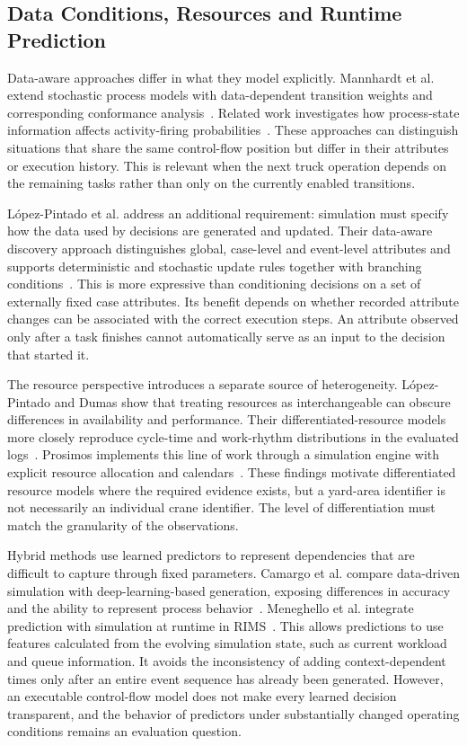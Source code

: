 \subsection{Data Conditions, Resources and Runtime Prediction}

Data-aware approaches differ in what they model explicitly. Mannhardt et al. extend stochastic process models with data-dependent transition weights and corresponding conformance analysis~\cite{mannhardt2023stochasticProcessesModelling}. Related work investigates how process-state information affects activity-firing probabilities~\cite{Vinci2023Inf.Activ.Prob}. These approaches can distinguish situations that share the same control-flow position but differ in their attributes or execution history. This is relevant when the next truck operation depends on the remaining tasks rather than only on the currently enabled transitions.

L\'opez-Pintado et al. address an additional requirement: simulation must specify how the data used by decisions are generated and updated. Their data-aware discovery approach distinguishes global, case-level and event-level attributes and supports deterministic and stochastic update rules together with branching conditions~\cite{lopez2024}. This is more expressive than conditioning decisions on a set of externally fixed case attributes. Its benefit depends on whether recorded attribute changes can be associated with the correct execution steps. An attribute observed only after a task finishes cannot automatically serve as an input to the decision that started it.

The resource perspective introduces a separate source of heterogeneity. L\'opez-Pintado and Dumas show that treating resources as interchangeable can obscure differences in availability and performance. Their differentiated-resource models more closely reproduce cycle-time and work-rhythm distributions in the evaluated logs~\cite{BPSdifferentiatedResources2022}. Prosimos implements this line of work through a simulation engine with explicit resource allocation and calendars~\cite{Prosimos2023}. These findings motivate differentiated resource models where the required evidence exists, but a yard-area identifier is not necessarily an individual crane identifier. The level of differentiation must match the granularity of the observations.

Hybrid methods use learned predictors to represent dependencies that are difficult to capture through fixed parameters. Camargo et al. compare data-driven simulation with deep-learning-based generation, exposing differences in accuracy and the ability to represent process behavior~\cite{Camargo2021}. Meneghello et al. integrate prediction with simulation at runtime in RIMS~\cite{runtimeIntegration2024}. This allows predictions to use features calculated from the evolving simulation state, such as current workload and queue information. It avoids the inconsistency of adding context-dependent times only after an entire event sequence has already been generated. However, an executable control-flow model does not make every learned decision transparent, and the behavior of predictors under substantially changed operating conditions remains an evaluation question.

